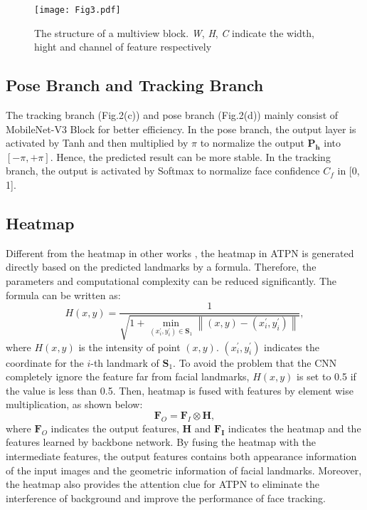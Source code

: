 \documentclass[3p,twocolumn, round, sort & compress]{elsarticle}
\begin{document}
\begin{figure}[t!]
	\centering
	\texttt{[image: Fig3.pdf]}
	\caption{The structure of a multiview block. \emph{W}, \emph{H}, \emph{C} indicate the width, hight and channel of feature respectively}
	\label{fig3}
\end{figure}

\subsection{Pose Branch and Tracking Branch}
The tracking branch (Fig.2(c)) and pose branch (Fig.2(d)) mainly consist of MobileNet-V3 Block for better efficiency. In the pose branch, the output layer is activated by Tanh and then multiplied by $\pi$ to normalize the output $\bm{P_h}$ into $[-\pi, +\pi]$. Hence, the predicted result can be more stable. In the tracking branch, the output is activated by Softmax to normalize face confidence $C_f$ in [0, 1].

\subsection{Heatmap}
Different from the heatmap in other works \citep{LAB, DeCaFA, PropNet}, the heatmap in ATPN is generated directly based on the predicted landmarks by a formula. Therefore, the parameters and computational complexity can be reduced significantly. The formula can be written as:
\begin{equation}
	H\left( {x,y} \right) = \frac{1}{{\sqrt {1 + {{\min }_{({x_i^\prime},{y_i^\prime}) \in {{\bm{S}}_{1}}}}\left\| {\left( {x,y} \right) - \left( {{x_i^\prime},{y_i^\prime}} \right)} \right\|} }},
\end{equation}
where $H(x,y)$ is the intensity of point $(x,y)$. $(x_i^\prime,y_i^\prime)$ indicates the coordinate for the $i$-th landmark of $\bm{S}_1$. To avoid the problem that the CNN completely ignore the feature far from facial landmarks, $H(x,y)$ is set to 0.5 if the value is less than 0.5. Then, heatmap is fused with features by element wise multiplication, as shown below:
\begin{equation}
{\bm{F}_O} = \bm{F}_I \otimes \bm{H},
\end{equation}
where $\bm{F}_O$ indicates the output features, $\bm{H}$ and $\bm{F_I}$ indicates the heatmap and the features learned by backbone network. By fusing the heatmap with the intermediate features, the output features contains both appearance information of the input images and the geometric information of facial landmarks. Moreover, the heatmap also provides the attention clue for ATPN to eliminate the interference of background and improve the performance of face tracking.
\end{document}
